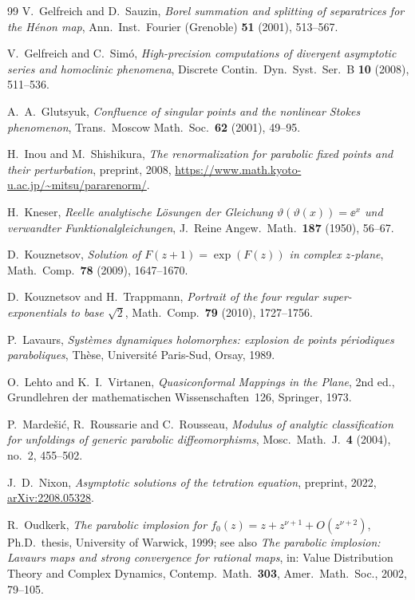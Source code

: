 \begin{thebibliography}{99}
V.~Gelfreich and D.~Sauzin,
\emph{Borel summation and splitting of separatrices for the H\'enon map},
Ann.\ Inst.\ Fourier (Grenoble) \textbf{51} (2001), 513--567.

V.~Gelfreich and C.~Sim\'o,
\emph{High-precision computations of divergent asymptotic series and
homoclinic phenomena},
Discrete Contin.\ Dyn.\ Syst.\ Ser.\ B \textbf{10} (2008), 511--536.

A.~A.~Glutsyuk,
\emph{Confluence of singular points and the nonlinear Stokes phenomenon},
Trans.\ Moscow Math.\ Soc.\ \textbf{62} (2001), 49--95.

H.~Inou and M.~Shishikura,
\emph{The renormalization for parabolic fixed points and their perturbation},
preprint, 2008,
\url{https://www.math.kyoto-u.ac.jp/~mitsu/pararenorm/}.

H.~Kneser,
\emph{Reelle analytische L\"osungen der Gleichung
$\vartheta(\vartheta(x))=\ee^{x}$ und verwandter Funktionalgleichungen},
J.\ Reine Angew.\ Math.\ \textbf{187} (1950), 56--67.

D.~Kouznetsov,
\emph{Solution of $F(z+1)=\exp(F(z))$ in complex $z$-plane},
Math.\ Comp.\ \textbf{78} (2009), 1647--1670.

D.~Kouznetsov and H.~Trappmann,
\emph{Portrait of the four regular super-exponentials to base $\sqrt2$},
Math.\ Comp.\ \textbf{79} (2010), 1727--1756.

P.~Lavaurs,
\emph{Syst\`emes dynamiques holomorphes: explosion de points p\'eriodiques
paraboliques}, Th\`ese, Universit\'e Paris-Sud, Orsay, 1989.

O.~Lehto and K.~I.~Virtanen,
\emph{Quasiconformal Mappings in the Plane}, 2nd ed.,
Grundlehren der mathematischen Wissenschaften~126, Springer, 1973.

P.~Marde\v{s}i\'c, R.~Roussarie and C.~Rousseau,
\emph{Modulus of analytic classification for unfoldings of generic parabolic
diffeomorphisms},
Mosc.\ Math.\ J.\ \textbf{4} (2004), no.~2, 455--502.

J.~D.~Nixon,
\emph{Asymptotic solutions of the tetration equation},
preprint, 2022, \href{https://arxiv.org/abs/2208.05328}{arXiv:2208.05328}.

R.~Oudkerk,
\emph{The parabolic implosion for
$f_0(z)=z+z^{\nu+1}+O(z^{\nu+2})$},
Ph.D.\ thesis, University of Warwick, 1999;
see also \emph{The parabolic implosion: Lavaurs maps and strong convergence for
rational maps}, in: Value Distribution Theory and Complex Dynamics,
Contemp.\ Math.\ \textbf{303}, Amer.\ Math.\ Soc., 2002, 79--105.


\end{thebibliography}
